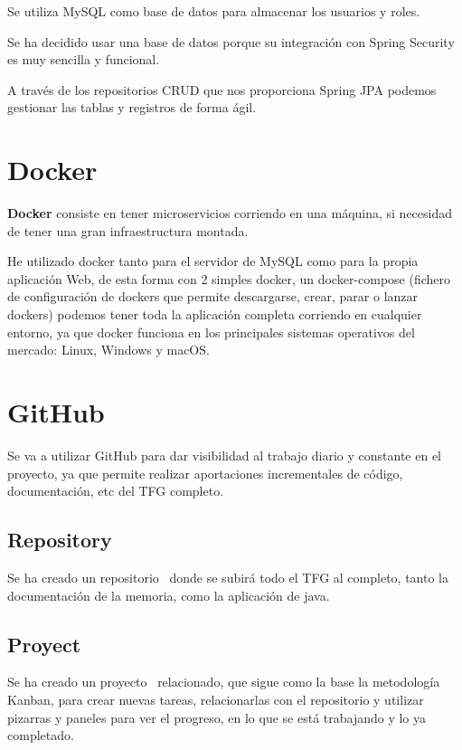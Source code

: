 Se utiliza MySQL como base de datos para almacenar los usuarios y roles.

Se ha decidido usar una base de datos porque su integración con Spring Security es muy sencilla y funcional. 

A través de los repositorios CRUD que nos proporciona Spring JPA podemos gestionar las tablas y registros de forma ágil.

\section{Docker}

\textbf{Docker} consiste en tener microservicios corriendo en una máquina, si necesidad de tener una gran infraestructura montada.

He utilizado docker tanto para el servidor de MySQL como para la propia aplicación Web, de esta forma con 2 simples docker, un docker-compose (fichero de configuración de dockers que permite descargarse, crear, parar o lanzar dockers) podemos tener toda la aplicación completa corriendo en cualquier entorno, ya que docker funciona en los principales sistemas operativos del mercado: Linux, Windows y macOS.

\section{GitHub}

Se va a utilizar GitHub para dar visibilidad al trabajo diario y constante en el proyecto, ya que permite realizar aportaciones incrementales de código, documentación, etc del TFG completo.

\subsection{Repository}

Se ha creado un repositorio~\cite{github:repo} donde se subirá todo el TFG al completo, tanto la documentación de la memoria, como la aplicación de java.

\subsection{Proyect}

Se ha creado un proyecto~\cite{github:proyect} relacionado, que sigue como la base la metodología Kanban, para crear nuevas tareas, relacionarlas con el repositorio y utilizar pizarras y paneles para ver el progreso, en lo que se está trabajando y lo ya completado.

